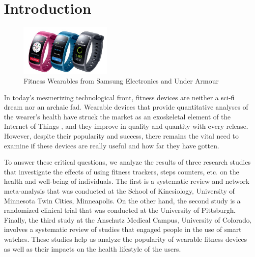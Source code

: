 \section{Introduction}
\begin{figure}
  \begin{center}
    \includegraphics[width=0.4\textwidth]{assets/SamsungWearables.jpg}
  \end{center}
  \caption{Fitness Wearables from Samsung Electronics and Under Armour}
  \label{fig:SamsungWearables}
\end{figure}
In today's mesmerizing technological front, fitness devices are neither a sci-fi dream nor an archaic fad. Wearable devices that provide quantitative analyses of the wearer's health have struck the market as an exoskeletal element of the Internet of Things \cite{ref05}, and they improve in quality and quantity with every release. However, despite their popularity and success, there remains the vital need to examine if these devices are really useful and how far they have gotten.

To answer these critical questions, we analyze the results of three research studies that investigate the effects of using fitness trackers, steps counters, etc. on the health and well-being of individuals. The first \cite{ref01} is a systematic review and network meta-analysis that was conducted at the School of Kinesiology, University of Minnesota Twin Cities, Minneapolis. On the other hand, the second study \cite{ref02} is a randomized clinical trial that was conducted at the University of Pittsburgh. Finally, the third study \cite{ref03} at the Anschutz Medical Campus, University of Colorado, involves a systematic review of studies that engaged people in the use of smart watches. These studies help us analyze the popularity of wearable fitness devices as well as their impacts on the health lifestyle of the users.